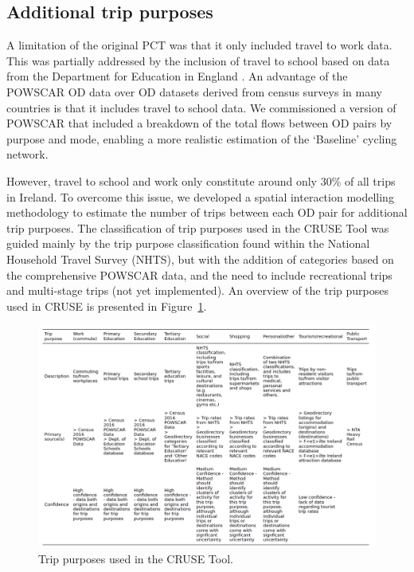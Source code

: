 \documentclass[
  super,
  preprint,
  3p]{elsarticle}
\begin{document}
\hypertarget{sec-trip-purposes}{%
\subsection{Additional trip purposes}\label{sec-trip-purposes}}

A limitation of the original PCT was that it only included travel to
work data. This was partially addressed by the inclusion of travel to
school based on data from the Department for Education in England
\citep{goodman2019}. An advantage of the POWSCAR OD data over OD
datasets derived from census surveys in many countries is that it
includes travel to school data. We commissioned a version of POWSCAR
that included a breakdown of the total flows between OD pairs by purpose
and mode, enabling a more realistic estimation of the `Baseline' cycling
network.

However, travel to school and work only constitute around only 30\% of
all trips in Ireland. To overcome this issue, we developed a spatial
interaction modelling methodology to estimate the number of trips
between each OD pair for additional trip purposes. The classification of
trip purposes used in the CRUSE Tool was guided mainly by the trip
purpose classification found within the National Household Travel Survey
(NHTS), but with the addition of categories based on the comprehensive
POWSCAR data, and the need to include recreational trips and multi-stage
trips (not yet implemented). An overview of the trip purposes used in
CRUSE is presented in Figure~\ref{fig-trip-purposes}.

\begin{figure}

{\centering 

\includegraphics{images/paste-4.png}

}

\caption{\label{fig-trip-purposes}Trip purposes used in the CRUSE Tool.}

\end{figure}
\end{document}
